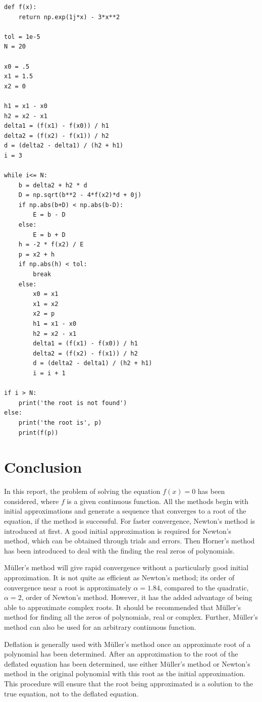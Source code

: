 \documentclass[preprint,12pt]{elsarticle}
\begin{document}
\begin{lstlisting}
def f(x):
    return np.exp(1j*x) - 3*x**2

tol = 1e-5
N = 20

x0 = .5
x1 = 1.5
x2 = 0

h1 = x1 - x0
h2 = x2 - x1
delta1 = (f(x1) - f(x0)) / h1
delta2 = (f(x2) - f(x1)) / h2
d = (delta2 - delta1) / (h2 + h1)
i = 3

while i<= N:
    b = delta2 + h2 * d
    D = np.sqrt(b**2 - 4*f(x2)*d + 0j)
    if np.abs(b+D) < np.abs(b-D):
        E = b - D
    else:
        E = b + D
    h = -2 * f(x2) / E
    p = x2 + h
    if np.abs(h) < tol:
        break
    else:
        x0 = x1
        x1 = x2
        x2 = p
        h1 = x1 - x0
        h2 = x2 - x1
        delta1 = (f(x1) - f(x0)) / h1
        delta2 = (f(x2) - f(x1)) / h2
        d = (delta2 - delta1) / (h2 + h1)
        i = i + 1

if i > N:
    print('the root is not found')
else:
    print('the root is', p)
    print(f(p))
\end{lstlisting}

\section{Conclusion}
\label{S:4}

In this report, the problem of solving the equation $f(x)=0$ has been considered, where $f$ is a given continuous function. All the methods begin with initial approximations and generate a sequence that converges to a root of the equation, if the method is successful. For faster convergence, Newton's method is introduced at first. A good initial approximation is required for Newton's method, which can be obtained through trials and errors. Then Horner's method has been introduced to deal with the finding the real zeros of polynomials.

M\"uller's method will give rapid convergence without a particularly good initial approximation. It is not quite as efficient as Newton’s method; its order of convergence near a root is approximately $\alpha=1.84$, compared to the quadratic, $\alpha=2$, order of Newton’s method. However, it has the added advantage of being able to approximate complex roots. It should be recommended that M\"uller's method for finding all the zeros of polynomials, real or complex. Further, M\"uller's method can also be used for an arbitrary continuous function.

Deflation is generally used with M\"uller's method once an approximate root of a polynomial has been determined. After an approximation to the root of the deflated equation has been determined, use either M\"uller's method or Newton's method in the original polynomial with this root as the initial approximation. This procedure will ensure that the root being approximated is a solution to the true equation, not to the deflated equation.
\end{document}
